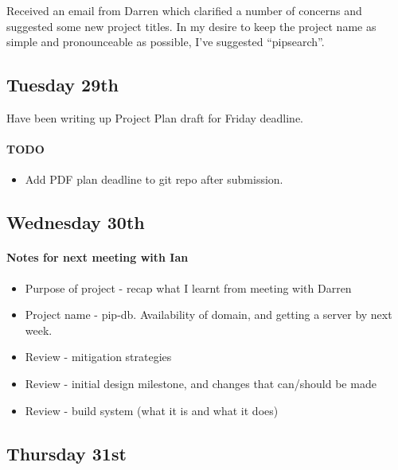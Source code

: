 \noindent
Received an email from Darren which clarified a number of concerns and suggested
some new project titles. In my desire to keep the project name as simple and
pronounceable as possible, I've suggested ``pipsearch''.

\subsection{Tuesday 29th}
Have been writing up Project Plan draft for Friday deadline.

\paragraph{TODO}
\begin{itemize}
\item Add PDF plan deadline to git repo after submission.
\end{itemize}

\subsection{Wednesday 30th}
\paragraph{Notes for next meeting with Ian}
\begin{itemize}
\item Purpose of project - recap what I learnt from meeting with Darren
\item Project name - pip-db. Availability of domain, and getting a server by
  next week.
\item Review - mitigation strategies
\item Review - initial design milestone, and changes that can/should be made
\item Review - build system (what it is and what it does)
\end{itemize}

\subsection{Thursday 31st}

